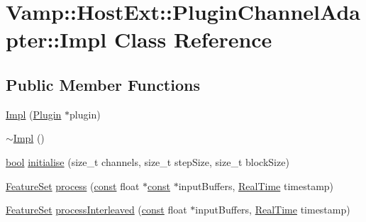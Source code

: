 \hypertarget{class_vamp_1_1_host_ext_1_1_plugin_channel_adapter_1_1_impl}{}\section{Vamp\+:\+:Host\+Ext\+:\+:Plugin\+Channel\+Adapter\+:\+:Impl Class Reference}
\label{class_vamp_1_1_host_ext_1_1_plugin_channel_adapter_1_1_impl}
\subsection*{Public Member Functions}
\begin{DoxyCompactItemize}
\item 
\hyperlink{class_vamp_1_1_host_ext_1_1_plugin_channel_adapter_1_1_impl_adff6fc53236f067148f82da1adca7876}{Impl} (\hyperlink{class_vamp_1_1_plugin}{Plugin} $\ast$plugin)
\item 
\hyperlink{class_vamp_1_1_host_ext_1_1_plugin_channel_adapter_1_1_impl_a2f93eb032a41a52967e1c47a2901fa33}{$\sim$\+Impl} ()
\item 
\hyperlink{mac_2config_2i386_2lib-src_2libsoxr_2soxr-config_8h_abb452686968e48b67397da5f97445f5b}{bool} \hyperlink{class_vamp_1_1_host_ext_1_1_plugin_channel_adapter_1_1_impl_abf47235b455880c94ec15bb71122afc8}{initialise} (size\+\_\+t channels, size\+\_\+t step\+Size, size\+\_\+t block\+Size)
\item 
\hyperlink{class_vamp_1_1_plugin_a448fb57dc245d47923ec9eeaf9856c5f}{Feature\+Set} \hyperlink{class_vamp_1_1_host_ext_1_1_plugin_channel_adapter_1_1_impl_ace73f776af09556fa6dc000c8bfdbe06}{process} (\hyperlink{getopt1_8c_a2c212835823e3c54a8ab6d95c652660e}{const} float $\ast$\hyperlink{getopt1_8c_a2c212835823e3c54a8ab6d95c652660e}{const} $\ast$input\+Buffers, \hyperlink{struct_vamp_1_1_real_time}{Real\+Time} timestamp)
\item 
\hyperlink{class_vamp_1_1_plugin_a448fb57dc245d47923ec9eeaf9856c5f}{Feature\+Set} \hyperlink{class_vamp_1_1_host_ext_1_1_plugin_channel_adapter_1_1_impl_aa5485da4b449ea325b81ff0e99e02833}{process\+Interleaved} (\hyperlink{getopt1_8c_a2c212835823e3c54a8ab6d95c652660e}{const} float $\ast$input\+Buffers, \hyperlink{struct_vamp_1_1_real_time}{Real\+Time} timestamp)
\end{DoxyCompactItemize}

